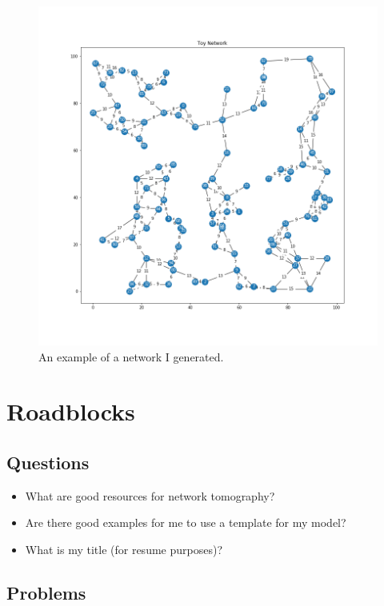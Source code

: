 \documentclass{weeklyreport}
\begin{document}
\begin{figure}[h!]
    \centering
    \includegraphics[width = \textwidth, trim = 85 90 85 85, clip]{week_1/Network_1a70e1d66f2040ce8a281f5823258bf1.png}
    \caption{An example of a network I generated.}
    \label{fig:Toy Network}
\end{figure}

\pagebreak
\section*{Roadblocks}
\subsection*{Questions}

\begin{itemize}
    \item What are good resources for network tomography?
    \item Are there good examples for me to use a template for my model?
    \item What is my title (for resume purposes)?
\end{itemize}

\subsection*{Problems}
\end{document}
